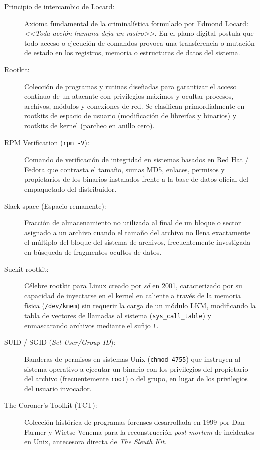 \begin{description}
    \item[Principio de intercambio de Locard:] Axioma fundamental de la criminalística formulado por Edmond Locard: \textit{<<Toda acción humana deja un rastro>>}. En el plano digital postula que todo acceso o ejecución de comandos provoca una transferencia o mutación de estado en los registros, memoria o estructuras de datos del sistema.

    \item[Rootkit:] Colección de programas y rutinas diseñadas para garantizar el acceso continuo de un atacante con privilegios máximos y ocultar procesos, archivos, módulos y conexiones de red. Se clasifican primordialmente en rootkits de espacio de usuario (modificación de librerías y binarios) y rootkits de kernel (parcheo en anillo cero).

    \item[RPM Verification (\texttt{rpm -V}):] Comando de verificación de integridad en sistemas basados en Red Hat / Fedora que contrasta el tamaño, sumas MD5, enlaces, permisos y propietarios de los binarios instalados frente a la base de datos oficial del empaquetado del distribuidor.

    \item[Slack space (Espacio remanente):] Fracción de almacenamiento no utilizada al final de un bloque o sector asignado a un archivo cuando el tamaño del archivo no llena exactamente el múltiplo del bloque del sistema de archivos, frecuentemente investigada en búsqueda de fragmentos ocultos de datos.

    \item[Suckit rootkit:] Célebre rootkit para Linux creado por \textit{sd} en 2001, caracterizado por su capacidad de inyectarse en el kernel en caliente a través de la memoria física (\texttt{/dev/kmem}) sin requerir la carga de un módulo LKM, modificando la tabla de vectores de llamadas al sistema (\texttt{sys\_call\_table}) y enmascarando archivos mediante el sufijo \texttt{!}.

    \item[SUID / SGID (\textit{Set User/Group ID}):] Banderas de permisos en sistemas Unix (\texttt{chmod 4755}) que instruyen al sistema operativo a ejecutar un binario con los privilegios del propietario del archivo (frecuentemente \texttt{root}) o del grupo, en lugar de los privilegios del usuario invocador.

    \item[The Coroner's Toolkit (TCT):] Colección histórica de programas forenses desarrollada en 1999 por Dan Farmer y Wietse Venema para la reconstrucción \textit{post-mortem} de incidentes en Unix, antecesora directa de \textit{The Sleuth Kit}.


\end{description}
